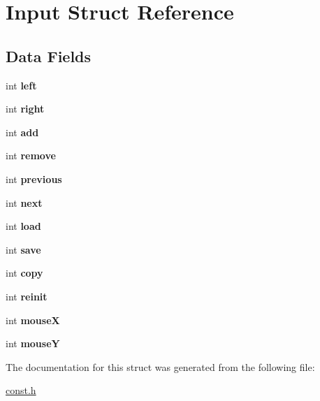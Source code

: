 \hypertarget{struct_input}{\section{Input Struct Reference}
\label{struct_input}
}
\subsection*{Data Fields}
\begin{DoxyCompactItemize}
\item 
\hypertarget{struct_input_ad8f5e19e19f12974c9713e920ec54331}{int {\bfseries left}}\label{struct_input_ad8f5e19e19f12974c9713e920ec54331}

\item 
\hypertarget{struct_input_a2f54f8b71f0d765e2b7dbd9a8b9774ff}{int {\bfseries right}}\label{struct_input_a2f54f8b71f0d765e2b7dbd9a8b9774ff}

\item 
\hypertarget{struct_input_aeb84694c28fdf361868a5234d9d74db7}{int {\bfseries add}}\label{struct_input_aeb84694c28fdf361868a5234d9d74db7}

\item 
\hypertarget{struct_input_add763b7684d0f15cf97b10dc883842aa}{int {\bfseries remove}}\label{struct_input_add763b7684d0f15cf97b10dc883842aa}

\item 
\hypertarget{struct_input_aa6680aad30971bdc23b341c2b6ee59eb}{int {\bfseries previous}}\label{struct_input_aa6680aad30971bdc23b341c2b6ee59eb}

\item 
\hypertarget{struct_input_a142a1b51e133e50c0a72b175958ac412}{int {\bfseries next}}\label{struct_input_a142a1b51e133e50c0a72b175958ac412}

\item 
\hypertarget{struct_input_aa1843f81d109cc0b7f234d61b5662119}{int {\bfseries load}}\label{struct_input_aa1843f81d109cc0b7f234d61b5662119}

\item 
\hypertarget{struct_input_abeb8baadb5d54f3e7a43fff7051f519f}{int {\bfseries save}}\label{struct_input_abeb8baadb5d54f3e7a43fff7051f519f}

\item 
\hypertarget{struct_input_a99fee425740a2c19690d6a6e7b0ddc90}{int {\bfseries copy}}\label{struct_input_a99fee425740a2c19690d6a6e7b0ddc90}

\item 
\hypertarget{struct_input_a685458edcf329006ae51a052d2b2f0d5}{int {\bfseries reinit}}\label{struct_input_a685458edcf329006ae51a052d2b2f0d5}

\item 
\hypertarget{struct_input_a85ea1b63086b31a15d3ed2579c5715a6}{int {\bfseries mouse\-X}}\label{struct_input_a85ea1b63086b31a15d3ed2579c5715a6}

\item 
\hypertarget{struct_input_a3637abebcaa9d04aa18b1610d0921e16}{int {\bfseries mouse\-Y}}\label{struct_input_a3637abebcaa9d04aa18b1610d0921e16}

\end{DoxyCompactItemize}


The documentation for this struct was generated from the following file\-:\begin{DoxyCompactItemize}
\item 
\hyperlink{const_8h}{const.\-h}\end{DoxyCompactItemize}
